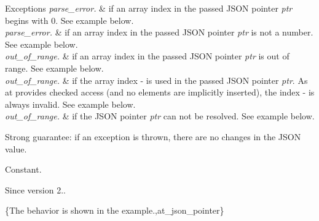 \begin{DoxyExceptions}{Exceptions}
{\em parse\+\_\+error.} & if an array index in the passed J\+S\+ON pointer {\itshape ptr} begins with \textquotesingle{}0\textquotesingle{}. See example below.\\
\hline
{\em parse\+\_\+error.} & if an array index in the passed J\+S\+ON pointer {\itshape ptr} is not a number. See example below.\\
\hline
{\em out\+\_\+of\+\_\+range.} & if an array index in the passed J\+S\+ON pointer {\itshape ptr} is out of range. See example below.\\
\hline
{\em out\+\_\+of\+\_\+range.} & if the array index \textquotesingle{}-\/\textquotesingle{} is used in the passed J\+S\+ON pointer {\itshape ptr}. As {\ttfamily at} provides checked access (and no elements are implicitly inserted), the index \textquotesingle{}-\/\textquotesingle{} is always invalid. See example below.\\
\hline
{\em out\+\_\+of\+\_\+range.} & if the J\+S\+ON pointer {\itshape ptr} can not be resolved. See example below.\\
\hline
\end{DoxyExceptions}
Strong guarantee\+: if an exception is thrown, there are no changes in the J\+S\+ON value.

Constant.

\begin{DoxySince}{Since}
version 2..
\end{DoxySince}
\{The behavior is shown in the example.,at\+\_\+json\+\_\+pointer\} \mbox{\label{classnlohmann_1_1basic__json_a7479d686148c26e252781bb32aa5d5c9}} 
